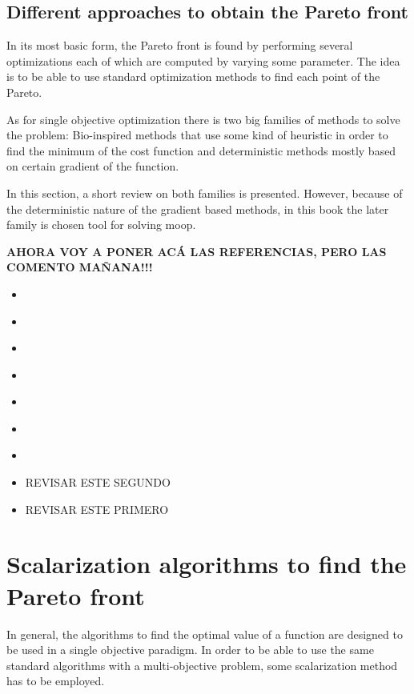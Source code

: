 \subsection{Different approaches to obtain the Pareto front}
In its most basic form, the Pareto front is found by performing several optimizations each of which are computed by varying some parameter. The idea is to be able to use standard optimization methods to find each point of the Pareto.

As for single objective optimization there is two big families of methods to solve the problem: Bio-inspired methods that use some kind of heuristic in order to find the minimum of the cost function and deterministic methods mostly based on certain gradient of the function.

In this section, a short review on both families is presented. However, because of the deterministic nature of the gradient based methods, in this book the later family is chosen tool for solving \gls{moop}.

\textbf{AHORA VOY A PONER ACÁ LAS REFERENCIAS, PERO LAS COMENTO MAÑANA!!!}
\begin{itemize}
	\item \citet{Rubio-Largo2014}
	\item \citet{Roman2006}
	\item \citet{Pierezan2014}
	\item \citet{Martinez2009a}
	\item \citet{Martinez2009}
	\item \citet{Cespedes2016}
	\item \citet{Ayala2012}
	\item \citet{Reynoso-Meza2012b} REVISAR ESTE SEGUNDO
	\item \citet{Zhou2011} REVISAR ESTE PRIMERO
\end{itemize}


\section{Scalarization algorithms to find the Pareto front}
\label{sec:design-methodologies}

In general, the algorithms to find the optimal value of a function are designed to be used in a single objective paradigm. In order to be able to use the same standard algorithms with a multi-objective problem, some scalarization method has to be employed.
%
